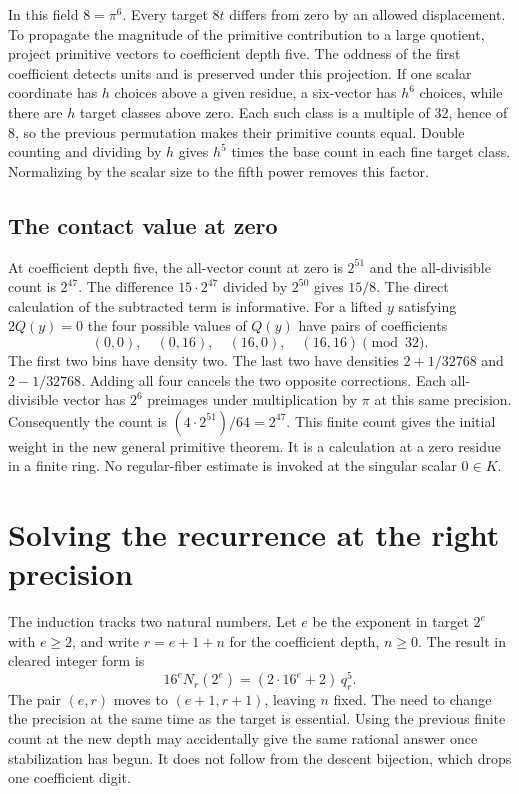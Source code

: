 \documentclass[12pt,letterpaper]{article}
\begin{document}
In this field $8=\pi^6$. Every target $8t$ differs from zero by an allowed displacement. To propagate the magnitude of the primitive contribution to a large quotient, project primitive vectors to coefficient depth five. The oddness of the first coefficient detects units and is preserved under this projection. If one scalar coordinate has $h$ choices above a given residue, a six-vector has $h^6$ choices, while there are $h$ target classes above zero. Each such class is a multiple of $32$, hence of $8$, so the previous permutation makes their primitive counts equal. Double counting and dividing by $h$ gives $h^5$ times the base count in each fine target class. Normalizing by the scalar size to the fifth power removes this factor.

\subsection{The contact value at zero}
At coefficient depth five, the all-vector count at zero is $2^{51}$ and the all-divisible count is $2^{47}$. The difference $15\cdot2^{47}$ divided by $2^{50}$ gives $15/8$. The direct calculation of the subtracted term is informative. For a lifted $y$ satisfying $2Q(y)=0$ the four possible values of $Q(y)$ have pairs of coefficients
\[
             (0,0),\quad(0,16),\quad(16,0),\quad(16,16)
                   \pmod {32}.
\]
The first two bins have density two. The last two have densities $2+1/32768$ and $2-1/32768$. Adding all four cancels the two opposite corrections. Each all-divisible vector has $2^6$ preimages under multiplication by $\pi$ at this same precision. Consequently the count is $(4\cdot2^{51})/64=2^{47}$. This finite count gives the initial weight in the new general primitive theorem. It is a calculation at a zero residue in a finite ring. No regular-fiber estimate is invoked at the singular scalar $0\in K$.

\section{Solving the recurrence at the right precision}
The induction tracks two natural numbers. Let $e$ be the exponent in target $2^e$ with $e\ge2$, and write $r=e+1+n$ for the coefficient depth, $n\ge0$. The result in cleared integer form is
\[
  16^e N_r(2^e)=(2\cdot16^e+2)\,q_r^5 .
\]
The pair $(e,r)$ moves to $(e+1,r+1)$, leaving $n$ fixed. The need to change the precision at the same time as the target is essential. Using the previous finite count at the new depth may accidentally give the same rational answer once stabilization has begun. It does not follow from the descent bijection, which drops one coefficient digit.
\end{document}
